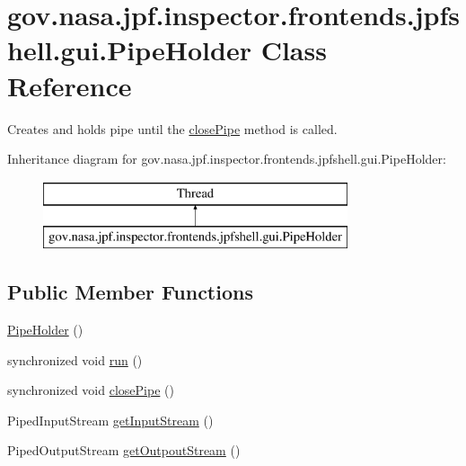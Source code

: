 \hypertarget{classgov_1_1nasa_1_1jpf_1_1inspector_1_1frontends_1_1jpfshell_1_1gui_1_1_pipe_holder}{}\section{gov.\+nasa.\+jpf.\+inspector.\+frontends.\+jpfshell.\+gui.\+Pipe\+Holder Class Reference}
\label{classgov_1_1nasa_1_1jpf_1_1inspector_1_1frontends_1_1jpfshell_1_1gui_1_1_pipe_holder}


Creates and holds pipe until the \hyperlink{classgov_1_1nasa_1_1jpf_1_1inspector_1_1frontends_1_1jpfshell_1_1gui_1_1_pipe_holder_ad2c1213baea1c64fa194fd24de53f25e}{close\+Pipe} method is called.  


Inheritance diagram for gov.\+nasa.\+jpf.\+inspector.\+frontends.\+jpfshell.\+gui.\+Pipe\+Holder\+:\begin{figure}[H]
\begin{center}
\leavevmode
\includegraphics[height=2.000000cm]{classgov_1_1nasa_1_1jpf_1_1inspector_1_1frontends_1_1jpfshell_1_1gui_1_1_pipe_holder}
\end{center}
\end{figure}
\subsection*{Public Member Functions}
\begin{DoxyCompactItemize}
\item 
\hyperlink{classgov_1_1nasa_1_1jpf_1_1inspector_1_1frontends_1_1jpfshell_1_1gui_1_1_pipe_holder_a7592843f82c8b8fb947d8f16fdb1a1b1}{Pipe\+Holder} ()
\item 
synchronized void \hyperlink{classgov_1_1nasa_1_1jpf_1_1inspector_1_1frontends_1_1jpfshell_1_1gui_1_1_pipe_holder_a1e3c8a34962321244699339c236f72da}{run} ()
\item 
synchronized void \hyperlink{classgov_1_1nasa_1_1jpf_1_1inspector_1_1frontends_1_1jpfshell_1_1gui_1_1_pipe_holder_ad2c1213baea1c64fa194fd24de53f25e}{close\+Pipe} ()
\item 
Piped\+Input\+Stream \hyperlink{classgov_1_1nasa_1_1jpf_1_1inspector_1_1frontends_1_1jpfshell_1_1gui_1_1_pipe_holder_ab6766f2f94aad197f7be440aabaaab86}{get\+Input\+Stream} ()
\item 
Piped\+Output\+Stream \hyperlink{classgov_1_1nasa_1_1jpf_1_1inspector_1_1frontends_1_1jpfshell_1_1gui_1_1_pipe_holder_a6641b45f2c26dd9ef1e0cbc804611bd6}{get\+Outpout\+Stream} ()
\end{DoxyCompactItemize}
